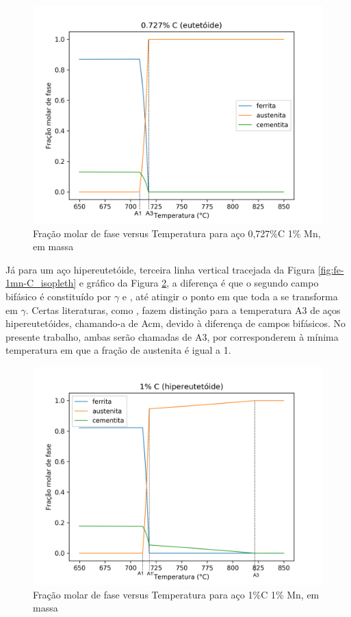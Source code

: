 \documentclass[brazil,tf,epusp]{usp}  %
\begin{document}
\begin{figure}[ht!]
  \includegraphics[width=1.1\textwidth]{img/Fe-Mn-0727C_edited.png}
  \caption{Fração molar de fase versus Temperatura para aço 0,727\%C 1\% Mn, em massa}
  \label{fig:fe-0727c-1mn}
\end{figure}

Já para um aço hipereutetóide, terceira linha vertical tracejada da Figura \ref{fig:fe-1mn-C_isopleth} e gráfico da Figura \ref{fig:fe-1c-1mn}, a diferença é que o segundo campo bifásico é constituído por $\gamma$ e , até atingir o ponto em que toda a  se transforma em $\gamma$. Certas literaturas, como , fazem distinção para a temperatura A3 de aços hipereutetóides, chamando-a de Acm, devido à diferença de campos bifásicos. No presente trabalho, ambas serão chamadas de A3, por corresponderem à mínima temperatura em que a fração de austenita é igual a 1.

\begin{figure}[ht!]
  \includegraphics[width=1.1\textwidth]{img/Fe-Mn-1C_edited.png}
  \caption{Fração molar de fase versus Temperatura para aço 1\%C 1\% Mn, em massa}
  \label{fig:fe-1c-1mn}
\end{figure}
\end{document}

